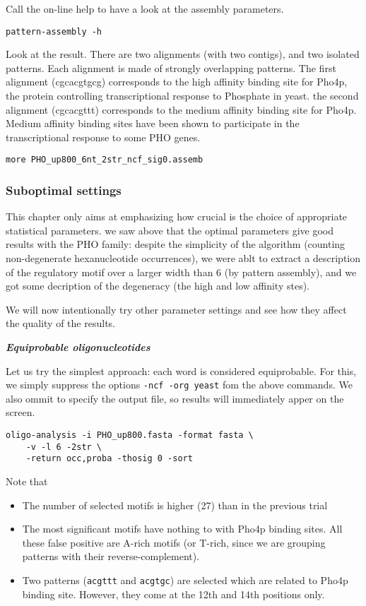 Call the on-line help to have a look at the assembly parameters. 
\begin{verbatim}
pattern-assembly -h
\end{verbatim}

Look at the result. There are two alignments (with two contigs), and
two isolated patterns. Each alignment is made of strongly overlapping
patterns. The first alignment (cgcacgtgcg) corresponds to the high
affinity binding site for Pho4p, the protein controlling
transcriptional response to Phosphate in yeast. the second alignment
(cgcacgttt) corresponds to the medium affinity binding site for
Pho4p. Medium affinity binding sites have been shown to participate in
the transcriptional response to some PHO genes.

\begin{verbatim}
more PHO_up800_6nt_2str_ncf_sig0.assemb
\end{verbatim}

\subsubsection{Suboptimal settings}

This chapter only aims at emphasizing how crucial is the choice of
appropriate statistical parameters. we saw above that the optimal
parameters give good results with the PHO family: despite the
simplicity of the algorithm (counting non-degenerate hexanucleotide
occurrences), we were ablt to extract a description of the regulatory
motif over a larger width than 6 (by pattern assembly), and we got
some decription of the degeneracy (the high and low affinity stes).

We will now intentionally try other parameter settings and see how
they affect the quality of the results.

\textit{\textbf{Equiprobable oligonucleotides}}

Let us try the simplest approach: each word is considered
equiprobable. For this, we simply suppress the options \texttt{-ncf -org
yeast} fom the above commands. We also ommit to specify the output
file, so results will immediately apper on the screen.

\begin{verbatim} 
oligo-analysis -i PHO_up800.fasta -format fasta \ 
    -v -l 6 -2str \
    -return occ,proba -thosig 0 -sort 
\end{verbatim}

Note that
\begin{itemize} 
\item The number of selected motifs is higher (27) than in the previous trial
\item The most significant motifs have nothing to with Pho4p binding
sites. All these false positive are A-rich motifs (or T-rich, since we
are grouping patterns with their reverse-complement).
\item Two patterns (\texttt{acgttt} and \texttt{acgtgc}) are selected
which are related to Pho4p binding site. However, they come at the
12th and 14th positions only.
\end{itemize}

